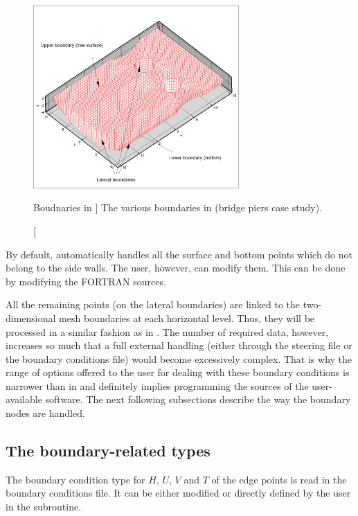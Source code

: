 \begin{figure}[H]%
\begin{center}
%
  \includegraphics[width=0.7\textwidth]{./graphics/bnd}
%
\end{center}
\caption
[Boudnaries in ]
{The various boundaries in  (bridge piers case study).}
\label{fig:bnd}
\end{figure}

By default,  automatically handles all the surface and bottom points
which do not belong to the side walls. The user, however, can modify them. This
can be done by modifying the FORTRAN sources.

All the remaining points (on the lateral boundaries) are linked to the
two-dimensional mesh boundaries at each horizontal level. Thus, they will be
processed in a similar fashion as in . The number of required data,
however, increases so much that a full external handling (either through the
steering file or the boundary conditions file) would become excessively
complex. That is why the range of options offered to the user for dealing with
these boundary conditions is narrower than in  and definitely implies
programming the sources of the user-available software. The next following
subsections describe the way the boundary nodes are handled.


\subsection{The boundary-related types}

The boundary condition type for $H$, $U$, $V$ and $T$ of the edge points is
read in the boundary conditions file. It can be either modified or directly
defined by the user in the  subroutine.

